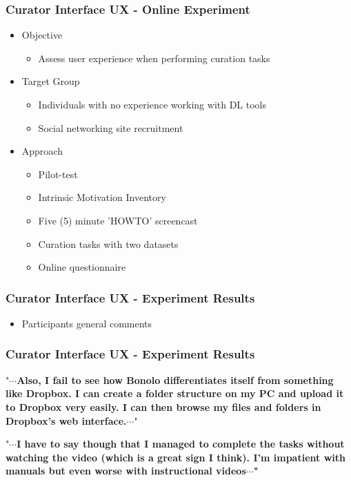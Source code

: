 \documentclass[xcolor=dvitex,t,11pt]{beamer}
\begin{document}
\begin{frame}[fragile]
\frametitle{Curator Interface UX - Online Experiment}
\begin{itemize}
\item<1-> Objective
\begin{itemize}
\item<2-> Assess user experience when performing curation tasks
\end{itemize}
\item<3-> Target Group
\begin{itemize}
\item<4-> Individuals with no experience working with DL tools
\item<5-> Social networking site recruitment
\end{itemize}
\item<6-> Approach
\begin{itemize}
\item<7-> Pilot-test
\item<8-> Intrinsic Motivation Inventory
\item<9-> Five (5) minute 'HOWTO' screencast
\item<10-> Curation tasks with two datasets
\item<11-> Online questionnaire
\end{itemize}
\end{itemize}
\end{frame}


\begin{frame}[fragile]
\frametitle{Curator Interface UX - Experiment Results}
\centering

\end{frame}


\begin{frame}[fragile]

\begin{itemize}
\item Participants general comments
\end{itemize}

\frametitle{Curator Interface UX - Experiment Results}
"\textbf{$\cdots$Also, I fail to see how Bonolo differentiates itself from something like Dropbox. I can create a folder structure on my PC and upload it to Dropbox very easily. I can then browse my files and folders in Dropbox's web interface.$\cdots$}"\\

\bigskip

"\textbf{$\cdots$I have to say though that I managed to complete the tasks without watching the video (which is a great sign I think). I'm impatient with manuals but even worse with instructional videos$\cdots$"}
\end{frame}
\end{document}
